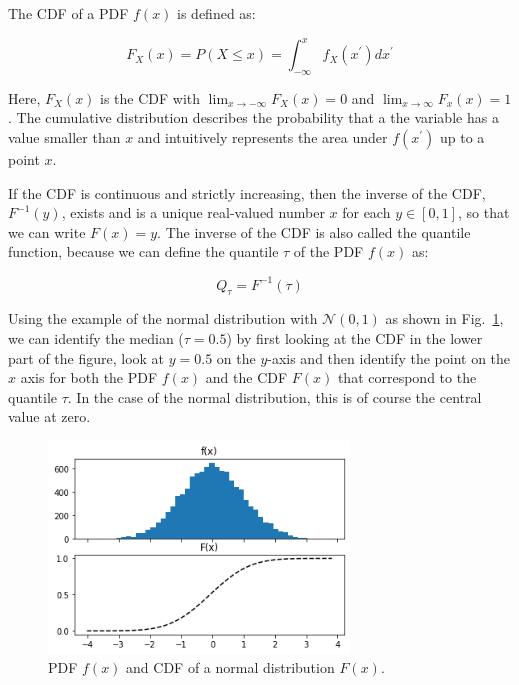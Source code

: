 \documentclass[BCOR=1mm, DIV=calc,10pt,
twoside=true,
twocolumn,
headings=normal]{scrartcl}
\newcommand{\fig}{Fig.~}
\begin{document}
\noindent
The CDF of a PDF $f(x)$ is defined as:

\begin{equation}
\label{eqn:CDF}
F_X(x) = P(X \le x) = \int_{-\infty}^{x} f_X(x^\prime) dx^\prime
\end{equation}

Here, $F_X(x)$ is the CDF with $\lim_{x \to -\infty}F_X(x) = 0$ and $\lim_{x \to \infty}F_x(x) = 1$. The cumulative distribution describes the probability that a the variable has a value smaller than $x$ and intuitively represents the area under $f(x^\prime)$ up to a point $x$.

If the CDF is continuous and strictly increasing, then the inverse of the CDF, $F^{-1}(y)$, exists and is a unique real-valued number $x$ for each $y \in [0,1]$, so that we can write $F(x) = y$. The inverse of the CDF is also called the quantile function, because we can define the quantile $\tau$ of the PDF $f(x)$ as:

\begin{equation}
Q_\tau = F^{-1}(\tau)
\end{equation}

Using the example of the normal distribution with $\mathcal{N}(0,1)$ as shown in \fig \ref{fig:PdfCdf}, we can identify the median ($\tau = 0.5$) by first looking at the CDF in the lower part of the figure, look at $y=0.5$ on the $y$-axis and then identify the point on the $x$ axis for both the PDF $f(x)$ and the CDF $F(x)$ that correspond to the quantile $\tau$. In the case of the normal distribution, this is of course the central value at zero.

\begin{figure}
\begin{center}
\includegraphics[width=8cm]{figs/PdfCdf}
\caption{\label{fig:PdfCdf} PDF $f(x)$ and CDF of a normal distribution $F(x)$.}
\end{center}
\end{figure}
\end{document}
